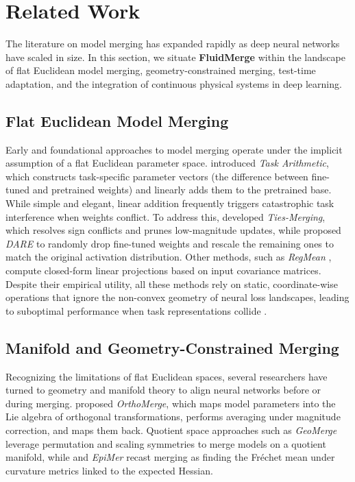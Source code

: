 \section{Related Work}
\label{sec:related_work}

The literature on model merging has expanded rapidly as deep neural networks have scaled in size. In this section, we situate \textbf{FluidMerge} within the landscape of flat Euclidean model merging, geometry-constrained merging, test-time adaptation, and the integration of continuous physical systems in deep learning.

\subsection{Flat Euclidean Model Merging}
Early and foundational approaches to model merging operate under the implicit assumption of a flat Euclidean parameter space. \citet{ilharco2023editing} introduced \emph{Task Arithmetic}, which constructs task-specific parameter vectors (the difference between fine-tuned and pretrained weights) and linearly adds them to the pretrained base. While simple and elegant, linear addition frequently triggers catastrophic task interference when weights conflict. To address this, \citet{yadav2024ties} developed \emph{Ties-Merging}, which resolves sign conflicts and prunes low-magnitude updates, while \citet{yu2023language} proposed \emph{DARE} to randomly drop fine-tuned weights and rescale the remaining ones to match the original activation distribution. Other methods, such as \emph{RegMean} \cite{jin2023raw}, compute closed-form linear projections based on input covariance matrices. Despite their empirical utility, all these methods rely on static, coordinate-wise operations that ignore the non-convex geometry of neural loss landscapes, leading to suboptimal performance when task representations collide \cite{yang2024adamerging, chen2024survey}.

\subsection{Manifold and Geometry-Constrained Merging}
Recognizing the limitations of flat Euclidean spaces, several researchers have turned to geometry and manifold theory to align neural networks before or during merging. \citet{yang2026orthomerge} proposed \emph{OrthoMerge}, which maps model parameters into the Lie algebra of orthogonal transformations, performs averaging under magnitude correction, and maps them back. Quotient space approaches such as \emph{GeoMerge} \cite{ainsworth2022git} leverage permutation and scaling symmetries to merge models on a quotient manifold, while \citet{peebles2020hessian} and \emph{EpiMer} recast merging as finding the Fr\'echet mean under curvature metrics linked to the expected Hessian. 

